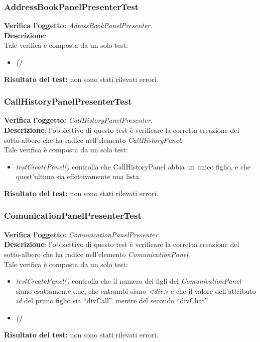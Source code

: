 \subsubsection{AddressBookPanelPresenterTest}
\textbf{Verifica l'oggetto:} \textit{AdressBookPanelPresenter}.\\
\textbf{Descrizione}:\\
Tale verifica è composta da un solo test:
\begin{itemize}
\item \textit{() }
\end{itemize}
\textbf{Risultato del test:} non sono stati rilevati errori.

\subsubsection{CallHistoryPanelPresenterTest}
\textbf{Verifica l'oggetto:} \textit{CallHistoryPanelPresenter}.\\
\textbf{Descrizione}: l'obbiettivo di questo test è verificare la corretta creazione del sotto-albero che ha radice nell'elemento \textit{CallHistoryPanel}.\\
Tale verifica è composta da un solo test:
\begin{itemize}
\item \textit{testCreatePanel() } controlla che CallHistoryPanel abbia un unico figlio, e che quest'ultimo sia effettivamente una lista.
\end{itemize}
\textbf{Risultato del test:} non sono stati rilevati errori.

\subsubsection{ComunicationPanelPresenterTest}
\textbf{Verifica l'oggetto:} \textit{ComunicationPanelPresenter}.\\
\textbf{Descrizione}: l'obbiettivo di questo test è verificare la corretta creazione del sotto-albero che ha radice nell'elemento \textit{ComunicationPanel}.\\
Tale verifica è composta da un solo test:
\begin{itemize}
\item \textit{testCreatePanel() } controlla che il numero dei figli del \textit{ComunicationPanel} siano esattamente due, che entrambi siano \textit{<div>} e che il valore dell'attributo \textit{id} del primo figlio sia ``divCall''. mentre del secondo ``divChat''. 
\item \textit{()} %
\end{itemize}
\textbf{Risultato del test:} non sono stati rilevati errori.


